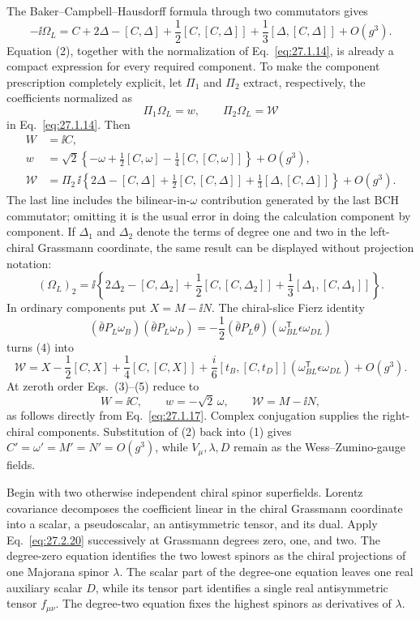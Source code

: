 \begin{enumerate}
  The Baker--Campbell--Hausdorff formula through two commutators gives
  \[
    -\ii\Omega_L=C+2\Delta-[C,\Delta]
      +\frac12[C,[C,\Delta]]
      +\frac13[\Delta,[C,\Delta]]+O(g^3).
    \tag{2}
  \]
  Equation (2), together with the normalization of
  Eq.~\eqref{eq:27.1.14}, is already a compact expression for every
  required component.  To make the component prescription completely
  explicit, let \(\Pi_1\) and \(\Pi_2\) extract, respectively, the
  coefficients normalized as
  \[
    \Pi_1\Omega_L=w,\qquad \Pi_2\Omega_L=\mathcal W
  \]
  in Eq.~\eqref{eq:27.1.14}.  Then
  \[
  \begin{aligned}
    W&=\ii C,\\
    w&=\sqrt2\left\{-\omega+\frac12[C,\omega]
                 -\frac14[C,[C,\omega]]\right\}+O(g^3),\\
    \mathcal W
      &=\Pi_2\,\ii\left\{
          2\Delta-[C,\Delta]+\frac12[C,[C,\Delta]]
          +\frac13[\Delta,[C,\Delta]]\right\}+O(g^3).
  \end{aligned}
  \tag{3}
  \]
  The last line includes the bilinear-in-\(\omega\) contribution generated
  by the last BCH commutator; omitting it is the usual error in doing the
  calculation component by component.  If
  \(\Delta_1\) and \(\Delta_2\) denote the terms of degree one and two in
  the left-chiral Grassmann coordinate, the same result can be displayed
  without projection notation:
  \[
    (\Omega_L)_2=\ii\left\{
      2\Delta_2-[C,\Delta_2]+\frac12[C,[C,\Delta_2]]
      +\frac13[\Delta_1,[C,\Delta_1]]\right\}.
    \tag{4}
  \]
  In ordinary components put \(X=M-\ii N\).  The chiral-slice Fierz identity
  \[
    (\bar\theta P_L\omega_B)(\bar\theta P_L\omega_D)
      =-\frac12(\bar\theta P_L\theta)
        (\omega_{BL}^{\mathsf T}\epsilon\omega_{DL})
  \]
  turns (4) into
  \[
    \mathcal W=X-\frac12[C,X]+\frac14[C,[C,X]]
      +\frac i6[t_B,[C,t_D]]
        (\omega_{BL}^{\mathsf T}\epsilon\omega_{DL})+O(g^3).
    \tag{5}
  \]
  At zeroth order Eqs.~(3)--(5) reduce to
  \[
    W=\ii C,\qquad w=-\sqrt2\,\omega,\qquad
    \mathcal W=M-\ii N,
  \]
  as follows directly from Eq.~\eqref{eq:27.1.17}.  Complex conjugation
  supplies the right-chiral components.  Substitution of (2) back into
  (1) gives
  \(C'=\omega'=M'=N'=O(g^3)\), while \(V_\mu,\lambda,D\) remain as the
  Wess--Zumino-gauge fields.

  Begin with two otherwise independent chiral spinor superfields.  Lorentz
  covariance decomposes the coefficient linear in the chiral Grassmann
  coordinate into a scalar, a pseudoscalar, an antisymmetric tensor, and
  its dual.  Apply Eq.~\eqref{eq:27.2.20} successively at Grassmann degrees
  zero, one, and two.  The degree-zero equation identifies the two lowest
  spinors as the chiral projections of one Majorana spinor \(\lambda\).
  The scalar part of the degree-one equation leaves one real auxiliary
  scalar \(D\), while its tensor part identifies a single real
  antisymmetric tensor \(f_{\mu\nu}\).  The degree-two equation fixes the
  highest spinors as derivatives of \(\lambda\).


\end{enumerate}
